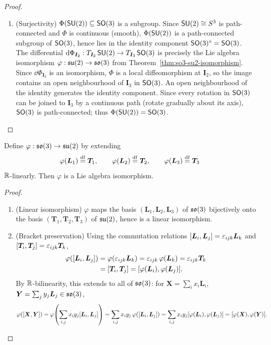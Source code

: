 \documentclass[11pt,reqno]{amsart}
\renewcommand{\phi}{\varphi}
\begin{document}
\begin{proof}
\begin{enumerate}
\item (Surjectivity)
$\Phi(\operatorname{\mathsf{SU}}(2))\subseteq\operatorname{\mathsf{SO}}(3)$ is a subgroup.  Since $\operatorname{\mathsf{SU}}(2)\cong S^3$ is
path-connected and $\Phi$ is continuous (smooth), $\Phi(\operatorname{\mathsf{SU}}(2))$ is a
path-connected subgroup of $\operatorname{\mathsf{SO}}(3)$, hence lies in the identity component
$\operatorname{\mathsf{SO}}(3)^\circ=\operatorname{\mathsf{SO}}(3)$.
The differential $\mathrm{d}\Phi_{\bm I_2}:T_{\bm I_2}\operatorname{\mathsf{SU}}(2)\to T_{\bm I_3}\operatorname{\mathsf{SO}}(3)$
is precisely the Lie algebra isomorphism
$\phi:\su(2)\to\so(3)$ from Theorem~\ref{thm:so3-su2-isomorphism}.
Since $\dd\Phi_{\bm I_2}$ is an isomorphism, $\Phi$ is a local diffeomorphism
at $\bm I_2$, so the image contains an open neighbourhood of $\bm I_3$ in
$\operatorname{\mathsf{SO}}(3)$.  An open neighbourhood of the identity generates the identity
component.  Since every rotation in $\operatorname{\mathsf{SO}}(3)$ can be joined to $\bm I_3$ by a
continuous path (rotate gradually about its axis), $\operatorname{\mathsf{SO}}(3)$ is path-connected;
thus $\Phi(\operatorname{\mathsf{SU}}(2))=\operatorname{\mathsf{SO}}(3)$.
\end{enumerate}
\end{proof}

\begin{Thm}\label{thm:so3-su2-isomorphism}
Define $\phi:\so(3)\to\su(2)$ by extending
\[
\phi(\bm L_1)\df \bm T_1,\qquad\phi(\bm L_2)\df \bm T_2,\qquad\phi(\bm L_3)\df \bm T_3
\]
$\mathbb{R}$-linearly.  Then $\phi$ is a Lie algebra isomorphism.
\end{Thm}
\begin{proof}
\begin{enumerate}
\item (Linear isomorphism)
$\phi$ maps the basis $(\bm L_1,\bm L_2,\bm L_3)$ of $\mathfrak{so}(3)$ bijectively onto the
basis $(\bm T_1,\bm T_2,\bm T_3)$ of $\mathfrak{su}(2)$, hence is a linear isomorphism.

\item (Bracket preservation)
Using the commutation relations $\SqBr{\bm L_i,\bm L_j}=\eps_{ijk}\bm L_k$ and
$\SqBr{\bm T_i,\bm T_j}=\eps_{ijk}\bm T_k$,
\[
\begin{aligned}
\phi\Br{\SqBr{\bm L_i,\bm L_j}}
&=\phi\Br{\eps_{ijk}\bm L_k}
=\eps_{ijk}\,\phi(\bm L_k)
=\eps_{ijk}\bm T_k \\
&=\SqBr{\bm T_i,\bm T_j}
=\SqBr{\phi(\bm L_i),\phi(\bm L_j)}.
\end{aligned}
\]
By $\mathbb{R}$-bilinearity, this extends to all of $\mathfrak{so}(3)$:
for $\bm X=\sum_i x_i \bm L_i$, $\bm Y=\sum_j y_j \bm L_j\in\mathfrak{so}(3)$,
\[
\phi\Br{\SqBr{\bm X,\bm Y}}
=\phi\Br{\sum_{i,j}x_i y_j\SqBr{\bm L_i,\bm L_j}}
=\sum_{i,j}x_i y_j\,\phi\Br{\SqBr{\bm L_i,\bm L_j}}
=\sum_{i,j}x_i y_j\SqBr{\phi(\bm L_i),\phi(\bm L_j)}
=\SqBr{\phi(\bm X),\phi(\bm Y)}.
\]

\end{enumerate}
\end{proof}
\end{document}
